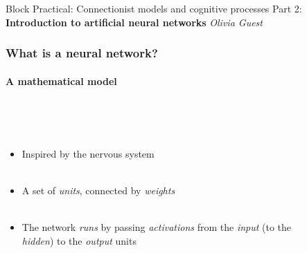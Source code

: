 \documentclass{beamer}
\begin{document}
\begin{frame}
% 
\centering\Huge Block Practical: Connectionist models and cognitive processes
\vfill \huge
\centering Part 2: \textbf{Introduction to artificial neural networks} \large
\vfill
\textit{
Olivia Guest }

\end{frame}


\begin{frame}
\frametitle{What is a neural network?}
\framesubtitle{A mathematical model}
 \begin{columns}[T]
    \begin{column}{.45\textwidth} 
     \ \\ 
     \ \\
\begin{itemize}[<+->]
\item Inspired by the nervous system \\ \
 \item A set of \emph{units}, connected by \emph{weights} \\ \
\item The network \emph{runs} by passing \emph{activations} from the \emph{input} (to the \emph{hidden}) to the \emph{output} units \\ \
\end{itemize}
\end{column}
\begin{column}{.55\textwidth}
\begin{figure}[t]
 \begin{flushleft}


\end{flushleft}
\end{figure}
\end{column}
\end{columns}
\end{frame}
\end{document}

